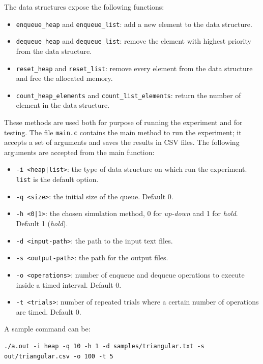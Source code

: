 \documentclass{article}
\begin{document}
The data structures expose the following functions:

\begin{itemize}
    \item \texttt{enqueue\_heap} and \texttt{enqueue\_list}: add a new element to the data structure.
    \item \texttt{dequeue\_heap} and \texttt{dequeue\_list}: remove the element with highest priority from the data structure.
    \item \texttt{reset\_heap} and \texttt{reset\_list}: remove every element from the data structure and free the allocated memory.
    \item \texttt{count\_heap\_elements} and \texttt{count\_list\_elements}: return the number of element in the data structure.
\end{itemize}

These methods are used both for purpose of running the experiment and for testing. The file \texttt{main.c} contains the main method to run the experiment; it accepts a set of arguments and saves the results in CSV files. The following arguments are accepted from the main function:

\begin{itemize}
    \item \texttt{-i <heap|list>}: the type of data structure on which run the experiment. \texttt{list} is the default option.
    \item \texttt{-q <size>}: the initial size of the queue. Default 0.
    \item \texttt{-h <0|1>}: the chosen simulation method, 0 for \textit{up-down} and 1 for \textit{hold}. Default 1 (\textit{hold}).
    \item \texttt{-d <input-path>}: the path to the input text files.
    \item \texttt{-s <output-path>}: the path for the output files.
    \item \texttt{-o <operations>}: number of enqueue and dequeue operations to execute inside a timed interval. Default 0.
    \item \texttt{-t <trials>}: number of repeated trials where a certain number of operations are timed. Default 0.
\end{itemize}

A sample command can be:

\begin{verbatim}
./a.out -i heap -q 10 -h 1 -d samples/triangular.txt -s out/triangular.csv -o 100 -t 5   
\end{verbatim}
\end{document}

